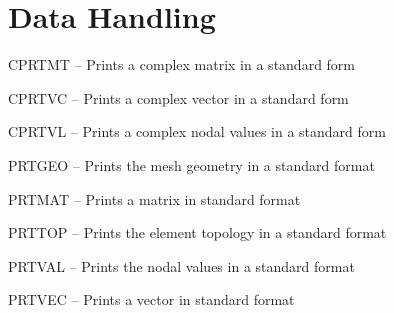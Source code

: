 \section{Data Handling}
\begin{list}{}{\leftmargin=57pt }
\item[CPRTMT \hfill] -- Prints a complex matrix in a standard form
\item[CPRTVC \hfill] -- Prints a complex vector in a standard form
\item[CPRTVL \hfill] -- Prints a complex nodal values in a standard form
\item[PRTGEO \hfill] -- Prints the mesh geometry in a standard format
\item[PRTMAT \hfill] -- Prints a matrix in standard format
\item[PRTTOP \hfill] -- Prints the element topology in a standard format
\item[PRTVAL \hfill] -- Prints the nodal values in a standard format
\item[PRTVEC \hfill] -- Prints a vector in standard format
\end{list}
